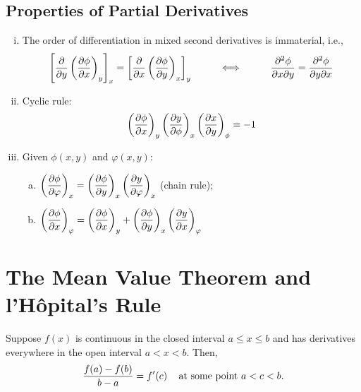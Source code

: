 \subsection{Properties of Partial Derivatives}\label{Appendix_Calculus:Properties}
  \begin{enumerate}[(i)]
%
     \item The order of differentiation in mixed second derivatives is immaterial, i.e.,
        \begin{displaymath}
           \left[\displaystyle\frac{\partial}{\partial y}\left(\displaystyle\frac{\partial\phi}{\partial x}\right)_{y}\right]_{x} = \left[\displaystyle\frac{\partial}{\partial x}\left(\displaystyle\frac{\partial\phi}{\partial y}\right)_{x}\right]_{y} \hspace{1cm}\Longleftrightarrow\hspace{1cm} \displaystyle\frac{\partial^{2}\phi}{\partial x\partial y} = \displaystyle\frac{\partial^{2}\phi}{\partial y\partial x}
        \end{displaymath}
%
     \item Cyclic rule:
        \begin{displaymath}
           \left(\displaystyle\frac{\partial\phi}{\partial x}\right)_{y}\left(\displaystyle\frac{\partial y}{\partial \phi}\right)_{x}\left(\displaystyle\frac{\partial x}{\partial y}\right)_{\phi} = -1
        \end{displaymath}
%
     \item Given $\phi(x,y)$ and $\varphi(x,y)$:
        \begin{enumerate}[(a)]
           \item $\left(\displaystyle\frac{\partial\phi}{\partial\varphi}\right)_{x} = \left(\displaystyle\frac{\partial\phi}{\partial y}\right)_{x}\left(\displaystyle\frac{\partial y}{\partial\varphi}\right)_{x}$  (chain rule);
           \item $\left(\displaystyle\frac{\partial\phi}{\partial x}\right)_{\varphi} = \left(\displaystyle\frac{\partial\phi}{\partial x}\right)_{y} + \left(\displaystyle\frac{\partial\phi}{\partial y}\right)_{x}\left(\displaystyle\frac{\partial y}{\partial x}\right)_{\varphi} $
        \end{enumerate}  
%
  \end{enumerate}

\section{The Mean Value Theorem and l'H\^opital's Rule}\label{Appendix:lHopital}

\begin{theorem}\label{Appendix:MeanValueTheorem}
Suppose $f(x)$ is continuous in the closed interval $a\leq x\leq b$ and has derivatives everywhere in the open interval $a<x<b$. Then,
     \begin{equation}
       \displaystyle\frac{f(a)-f(b)}{b-a} = f'(c)\;\;\;\text{ at some point } a<c<b.
     \end{equation}
\end{theorem}

